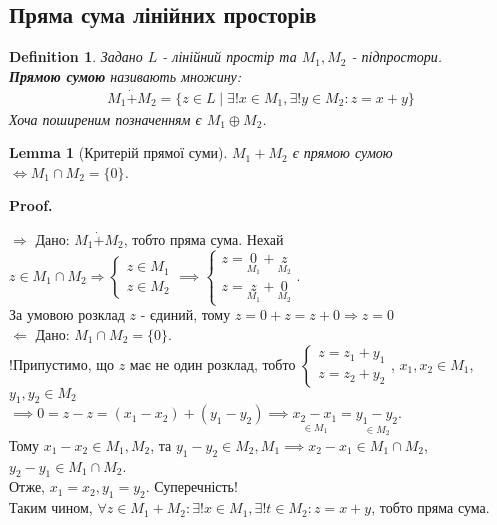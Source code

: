 \documentclass[a4paper, 10pt]{article}
\makeatletter
\def\rightproof{$\boxed{\Rightarrow}$ }
\def\leftproof{$\boxed{\Leftarrow}$ }
\theoremstyle{theoremdd}
\newtheorem{definition}[theorem]{Definition}
\newtheorem{lemma}[theorem]{Lemma}
\renewenvironment{proof}[1][Proof.\\]{\par
\pushQED{\hfill \qed}%
\normalfont \topsep6\p@\@plus6\p@\relax
\trivlist
\item\relax
{\bfseries
#1\@addpunct{.}}\hspace\labelsep\ignorespaces
}{%
\popQED\endtrivlist\@endpefalse
}
\makeatother
\begin{document}
	\subsection{Пряма сума лінійних просторів}
	\begin{definition}
	Задано $L$ - лінійний простір та $M_1, M_2$ - підпростори.\\
	\textbf{Прямою сумою} називають множину:
	\begin{align*}
	M_1 \dot{+} M_2 = \{z \in L \mid \exists! x \in M_1, \exists! y \in M_2: z = x+y\}
	\end{align*}
	Хоча поширеним позначенням є $M_1 \oplus M_2$.
	\end{definition}
	
	\begin{lemma}[Критерій прямої суми]
	$M_1 + M_2$ є прямою сумою $\iff M_1 \cap M_2 = \{0\}$.
	\end{lemma}
	
	\begin{proof}
	\rightproof Дано: $M_1 \dot{+} M_2$, тобто пряма сума. Нехай $z \in M_1 \cap M_2 \Rightarrow \begin{cases} z \in M_1 \\ z \in M_2 \end{cases} \implies \begin{cases} z = \underset{M_1}{0} + \underset{M_2}{z} \\ z = \underset{M_1}{z} + \underset{M_2}{0} \end{cases}$.\\
	За умовою розклад $z$ - єдиний, тому $z=0+z=z+0 \Rightarrow z = 0$
	\bigskip \\
	\leftproof Дано: $M_1 \cap M_2 = \{0\}$.\\
	!Припустимо, що $z$ має не один розклад, тобто $\begin{cases} z = z_1 + y_1 \\ z = z_2 + y_2 \end{cases}$, $x_1,x_2 \in M_1$, $y_1,y_2 \in M_2$\\
	$\implies 0 = z-z=(x_1-x_2)+(y_1-y_2) \implies \underset{\in M_1}{x_2-x_1}=\underset{\in M_2}{y_1-y_2}$.\\
	Тому $x_1-x_2 \in M_1, M_2$, та $y_1-y_2 \in M_2, M_1 \implies x_2-x_1 \in M_1 \cap M_2$, $y_2 - y_1 \in M_1 \cap M_2$.\\
	Отже, $x_1 = x_2, y_1 = y_2$. Суперечність! \\
	Таким чином, $\forall z \in M_1 + M_2: \exists! x \in M_1, \exists! t \in M_2: z = x+y$, тобто пряма сума.
	\end{proof}
	
\end{document}
